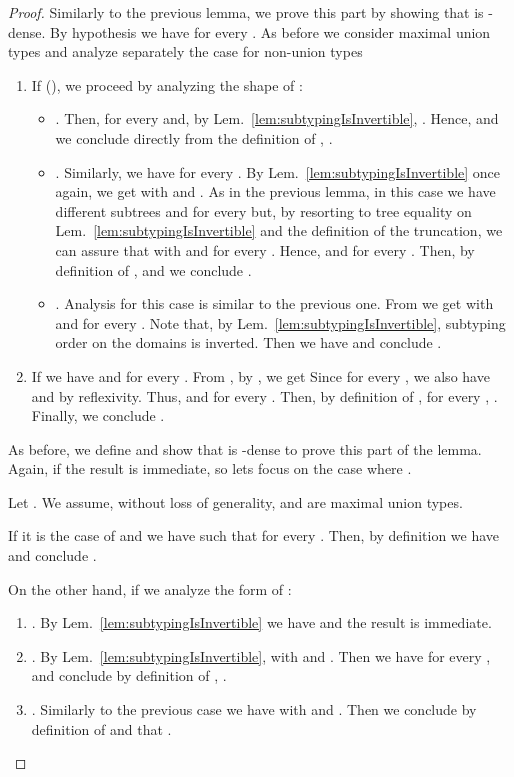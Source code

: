 \begin{proof}
 Similarly to the previous lemma, we prove this part by showing
that  is -dense. By hypothesis
we have  for every . As
before we consider maximal union types and analyze separately the case for
non-union types 
\begin{enumerate}
  \item If  (\ie ), we proceed by
  analyzing the shape of :
  \begin{itemize}
    \item . Then,  for every  and, by
    Lem.~\ref{lem:subtypingIsInvertible}, . Hence, 
    and we conclude directly from the definition of ,
    .
    
    \item . Similarly, we have  for every . By
    Lem.~\ref{lem:subtypingIsInvertible} once again, we get  with  and
    . As in the previous lemma, in this case
    we have different subtrees  and  for every  but, by
    resorting to tree equality on Lem.~\ref{lem:subtypingIsInvertible} and the
    definition of the truncation, we can assure that  with  and  for every . Hence,  and  for every
    . Then, by definition of ,  and we conclude .
    
    \item . Analysis for this case is similar to
    the previous one. From  we get  with 
    and  for every . Note
    that, by Lem.~\ref{lem:subtypingIsInvertible}, subtyping order on the
    domains is inverted. Then we have  and conclude .
  \end{itemize}
  
  \item If  we have  and  for every . From , by , we get 
  Since  for every , we also have
   and  by reflexivity. Thus,  and  for
  every . Then, by definition of ,
   for every , . Finally, we conclude .
\end{enumerate}


 As before, we define  and show that is -dense to prove this part of the
lemma. Again, if  the result is immediate, so lets focus on the case
where .

Let . We assume, without loss of generality,  and 
are maximal union types.

If  it is the case of  and we have  such that  for every .
Then, by definition we have 
and conclude .

On the other hand, if  we analyze the form of :
\begin{enumerate}
  \item . By Lem.~\ref{lem:subtypingIsInvertible} we have 
  and the result is immediate.
  
  \item . By Lem.~\ref{lem:subtypingIsInvertible},
   with  and . Then we have  for every , and
  conclude by definition of , .
  
  \item . Similarly to the previous case we have
   with  and . Then we conclude by definition of  and 
  that .
\end{enumerate}
\end{proof}



